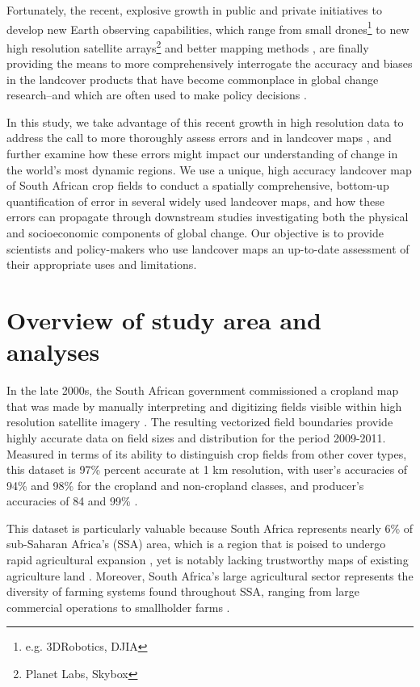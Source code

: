 \documentclass{pnastwo}
\begin{document}
\begin{article}
Fortunately, the recent, explosive growth in public and private initiatives to develop new Earth observing capabilities, which range from small drones\footnote{e.g. 3DRobotics, DJIA} to new high resolution satellite arrays\footnote{Planet Labs, Skybox} and better mapping methods \cite{fritz_geo-wiki:_2012,tuanmu_global_2014,estes_projected_2013, debats_generalized_2015}, are finally providing the means to more comprehensively interrogate the accuracy and biases in the landcover products that have become commonplace in global change research--and which are often used to make policy decisions \cite{searchinger_high_2015}.  

In this study, we take advantage of this recent growth in high resolution data to address the call to more thoroughly assess errors and in landcover maps \cite{kuemmerle_challenges_2013, olofsson_good_2014,olofsson_global_2012}, and further examine how these errors might impact our understanding of change in the world's most dynamic regions.  We use a unique, high accuracy landcover map of South African crop fields to conduct a spatially comprehensive, bottom-up quantification of error in several widely used landcover maps, and how these errors can propagate through downstream studies investigating both the physical and socioeconomic components of global change. Our objective is to provide scientists and policy-makers who use landcover maps an up-to-date assessment of their appropriate uses and limitations. 

\vspace{-0.5 cm}
\section{Overview of study area and analyses}
In the late 2000s, the South African government commissioned a cropland map that was made by manually interpreting and digitizing fields visible within high resolution satellite imagery \cite{fourie_better_2009}. The resulting vectorized field boundaries provide highly accurate data on field sizes and distribution for the period 2009-2011. Measured in terms of its ability to distinguish crop fields from other cover types, this dataset is 97\% percent accurate at 1 km resolution, with user's accuracies of 94\% and 98\% for the cropland and non-cropland classes, and producer's accuracies of 84 and 99\%  \cite[][SI]{estes_platform_2015}.

This dataset is particularly valuable because South Africa represents nearly 6\% of sub-Saharan Africa's (SSA) area, which is a region that is poised to undergo rapid agricultural expansion \cite{searchinger_high_2015}, yet is notably lacking trustworthy maps of existing agriculture land \cite{fritz_comparison_2010}. Moreover, South Africa's large agricultural sector represents the diversity of farming systems found throughout SSA, ranging from large commercial operations to smallholder farms \cite{hardy_rainfed_2011,estes_using_2014}.


\end{article}
\end{document}
